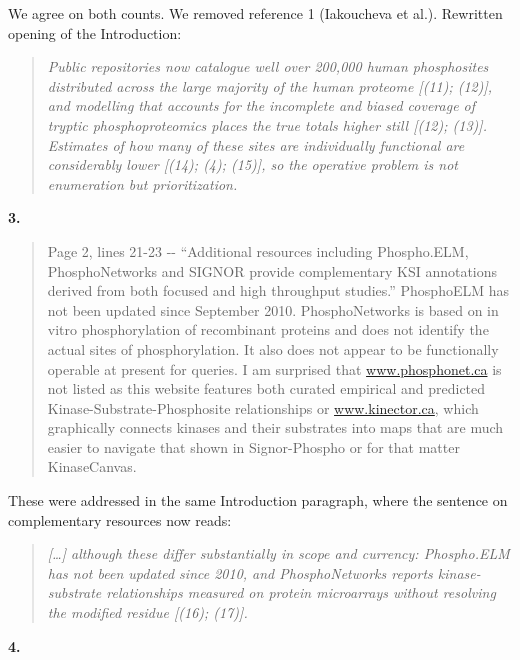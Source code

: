 \documentclass[
]{article}
\begin{document}
We agree on both counts. We removed reference 1 (Iakoucheva et al.).
Rewritten opening of the Introduction:

\begin{quote}
\emph{Public repositories now catalogue well over 200,000 human
phosphosites distributed across the large majority of the human proteome
{[}(11); (12){]}, and modelling that accounts for the incomplete and
biased coverage of tryptic phosphoproteomics places the true totals
higher still {[}(12); (13){]}. Estimates of how many of these sites are
individually functional are considerably lower {[}(14); (4); (15){]}, so
the operative problem is not enumeration but prioritization.}
\end{quote}

\textbf{3.}

\begin{quote}
Page 2, lines 21-23 -\/- ``Additional resources including Phospho.ELM,
PhosphoNetworks and SIGNOR provide complementary KSI annotations derived
from both focused and high throughput studies.'' PhosphoELM has not been
updated since September 2010. PhosphoNetworks is based on in vitro
phosphorylation of recombinant proteins and does not identify the actual
sites of phosphorylation. It also does not appear to be functionally
operable at present for queries. I am surprised that
\href{http://www.phosphonet.ca}{www.phosphonet.ca} is not listed as this
website features both curated empirical and predicted
Kinase-Substrate-Phosphosite relationships or
\href{http://www.kinector.ca}{www.kinector.ca}, which graphically
connects kinases and their substrates into maps that are much easier to
navigate that shown in Signor-Phospho or for that matter KinaseCanvas.
\end{quote}

These were addressed in the same Introduction paragraph, where the
sentence on complementary resources now reads:

\begin{quote}
\emph{{[}\ldots{]} although these differ substantially in scope and
currency: Phospho.ELM has not been updated since 2010, and
PhosphoNetworks reports kinase-substrate relationships measured on
protein microarrays without resolving the modified residue {[}(16);
(17){]}.}
\end{quote}

\textbf{4.}
\end{document}
